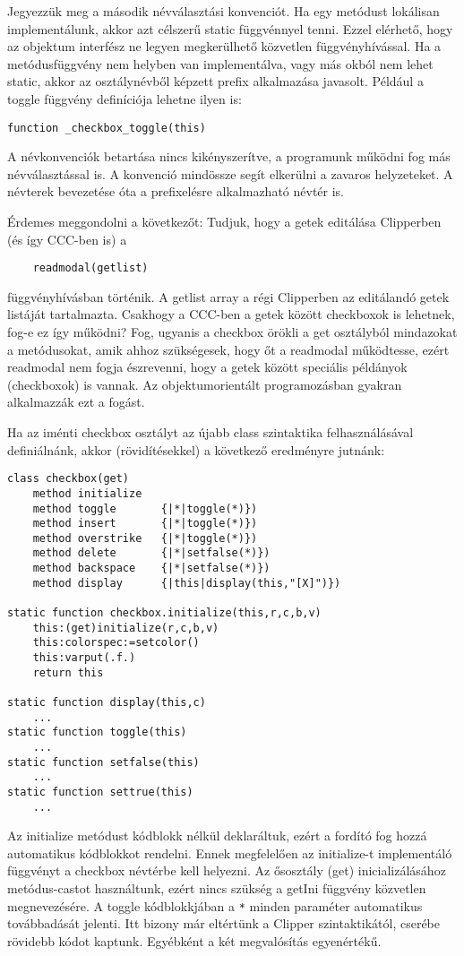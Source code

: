 Jegyezzük meg a második névválasztási konvenciót.
Ha egy metódust lokálisan implementálunk,
akkor azt célszerű static függvénnyel tenni. Ezzel
elérhető, hogy az objektum interfész ne legyen
megkerülhető közvetlen függvényhívással.
Ha a metódusfüggvény nem helyben van implementálva,
vagy más okból nem lehet static, akkor az osztálynévből
képzett prefix alkalmazása javasolt. Például a toggle
függvény definíciója lehetne ilyen is:
\begin{verbatim}
function _checkbox_toggle(this)
\end{verbatim}
A névkonvenciók betartása nincs kikényszerítve, a programunk
működni fog más névválasztással is. A konvenció mindössze
segít elkerülni a zavaros helyzeteket. A névterek bevezetése óta
a prefixelésre alkalmazható névtér is.

 
Érdemes meggondolni a következőt: Tudjuk, hogy a getek
editálása Clipperben (és így CCC-ben is) a
\begin{verbatim}
    readmodal(getlist)
\end{verbatim}
függvényhívásban történik. A getlist array a régi Clipperben
az editálandó getek listáját tartalmazta. Csakhogy a CCC-ben
a getek között checkboxok is lehetnek, fog-e ez így működni?
Fog, ugyanis a checkbox örökli a get osztályból mindazokat a metódusokat,
amik ahhoz szükségesek, hogy őt a readmodal működtesse,
ezért readmodal nem fogja észrevenni, hogy a getek között 
speciális példányok (checkboxok) is vannak. 
Az objektumorientált programozásban gyakran alkalmazzák ezt a fogást.

Ha az iménti checkbox osztályt az újabb class szintaktika
felhasználásával definiálnánk, akkor (rövidítésekkel) a következő 
eredményre jutnánk:

\begin{verbatim}
class checkbox(get)
    method initialize 
    method toggle       {|*|toggle(*)})
    method insert       {|*|toggle(*)})
    method overstrike   {|*|toggle(*)})
    method delete       {|*|setfalse(*)})
    method backspace    {|*|setfalse(*)})
    method display      {|this|display(this,"[X]")})

static function checkbox.initialize(this,r,c,b,v) 
    this:(get)initialize(r,c,b,v)
    this:colorspec:=setcolor()
    this:varput(.f.)
    return this

static function display(this,c)
    ...
static function toggle(this)
    ...
static function setfalse(this)
    ...
static function settrue(this)
    ...
\end{verbatim}
Az initialize metódust kódblokk nélkül deklaráltuk,
ezért a fordító fog hozzá automatikus kódblokkot rendelni.
Ennek megfelelően az initialize-t implementáló függvényt 
a checkbox névtérbe kell helyezni.
Az ősosztály (get) inicializálásához metódus-castot használtunk,
ezért nincs szükség a getIni függvény közvetlen megnevezésére.
A toggle kódblokkjában a \verb!*! minden paraméter 
automatikus továbbadását jelenti. Itt bizony már eltértünk
a Clipper szintaktikától, cserébe rövidebb kódot kaptunk.
Egyébként a két megvalósítás egyenértékű.


